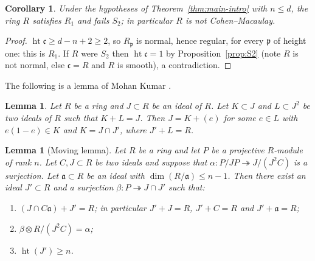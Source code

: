 \documentclass[11pt,reqno]{amsart}
\theoremstyle{plain}
\newtheorem{lemma}[theorem]{Lemma}
\newtheorem{corollary}[theorem]{Corollary}
\theoremstyle{definition}
\newcommand{\hgt}{\operatorname{ht}}
\newcommand{\cc}{\mathfrak{c}}
\newcommand{\pp}{\mathfrak{p}}
\begin{document}
\begin{corollary}\label{cor:notCM}
Under the hypotheses of Theorem~\ref{thm:main-intro} with $n\le d$, the ring $R$ satisfies
$R_1$ and fails $S_2$; in particular $R$ is not Cohen--Macaulay.
\end{corollary}

\begin{proof}
$\hgt\cc\ge d-n+2\ge 2$, so $R_\pp$ is normal, hence regular, for every $\pp$ of height one:
this is $R_1$. If $R$ were $S_2$ then $\hgt\cc=1$ by Proposition~\ref{prop:S2} (note $R$ is
not normal, else $\cc=R$ and $R$ is smooth), a contradiction.
\end{proof}
The following is a lemma of Mohan Kumar \cite[Lemma 3.2]{BK03}.
\begin{lemma}\label{lem:mohan}
Let $R$ be a ring and $J\subset R$ be an ideal of $R$. Let $K\subset J$
and $L\subset J^2$ be two ideals of $R$ such that $K+L=J$. Then $J=K+(e)$
for some $e\in L$ with $e(1-e)\in K$
and $K=J\cap J'$, where $J'+L=R$.
\end{lemma}

\begin{lemma}[Moving lemma]\label{lem:moving-a'}
Let $R$ be a ring and let $P$ be a projective $R$-module of rank $n$. Let
$C,J\subset R$ be two ideals and suppose that
$\alpha\colon P/JP\twoheadrightarrow J/(J^{2}C)$ is a surjection. Let
$\mathfrak{a}\subset R$ be an ideal with $\dim(R/\mathfrak{a})\le n-1$. Then
there exist an ideal $J'\subset R$ and a surjection
$\beta\colon P\twoheadrightarrow J\cap J'$ such that:
\begin{enumerate}
  \item $(J\cap C\mathfrak{a})+J'=R$; in particular $J'+J=R$, $J'+C=R$ and
        $J'+\mathfrak{a}=R$;
  \item $\beta\otimes R/(J^{2}C)=\alpha$;
  \item $\operatorname{ht}(J')\ge n$.
\end{enumerate}
\end{lemma}
\end{document}
